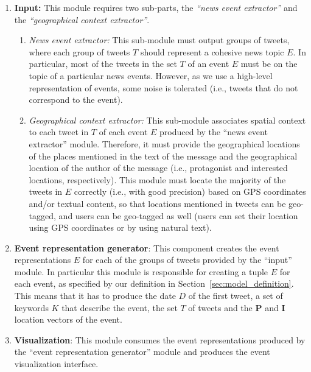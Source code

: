 
\begin{enumerate}

\item{\bf Input:} 
%
This module requires two sub-parts, the {\em ``news event extractor''} and the
{\em ``geographical context extractor''}.
%
    \begin{enumerate}
    \item{\em News event extractor:} 
    This sub-module must output groups of tweets, where each group of tweets $T$
    should represent a cohesive news topic $E$.  
    In particular, most of the tweets in the set $T$ of an event $E$ must be on
    the topic of a particular news events. 
    However, as we use a high-level representation of events, some noise is
    tolerated (i.e., tweets that do not correspond to the event).

    \item{\em Geographical context extractor:} 
    This sub-module associates spatial context to each tweet in $T$ of each event
    $E$ produced by the ``news event extractor'' module. 
    Therefore, it must provide the geographical locations of the places
    mentioned in the text of the message and the geographical location of the
    author of the message (i.e., protagonist and interested locations,
    respectively). 
    This module must locate the majority of the tweets in $E$ correctly (i.e.,
    with good precision) based on GPS coordinates and/or textual content, so
    that locations mentioned in tweets can be geo-tagged, and users can be
    geo-tagged as well (users can set their location using GPS coordinates or by
    using natural text).

    \end{enumerate}
%
\item{\bf Event representation generator}: 
%
This component creates the event representations $E$ for each of the groups of
tweets provided by the ``input'' module. 
%
In particular this module is responsible for creating a tuple $E$ for each
event, as specified by our definition in Section~\ref{sec:model_definition}.
%
This means that it has to produce the date $D$ of the first tweet, a set of
keywords $K$ that describe the event, the set $T$ of tweets and the $\mathbf{P}$
and $\mathbf{I}$ location vectors of the event.


\item{\bf Visualization}: 
%
This module consumes the event representations
produced by the ``event representation generator'' module and produces the event
visualization interface.

\end{enumerate}



